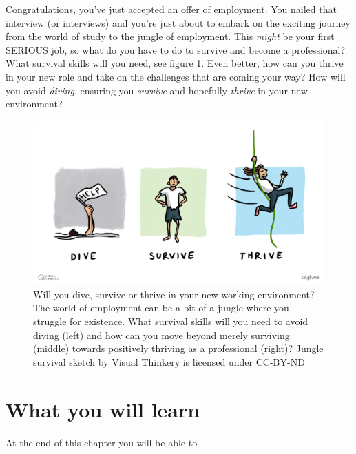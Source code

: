 \documentclass[
]{book}
\begin{document}
Congratulations, you've just accepted an offer of employment. You nailed that interview (or interviews) and you're just about to embark on the exciting journey from the world of study to the jungle of employment. This \emph{might} be your first SERIOUS job, so what do you have to do to survive and become a professional? What survival skills will you need, see figure \ref{fig:survival-fig}. Even better, how can you thrive in your new role and take on the challenges that are coming your way? How will you avoid \emph{diving}, ensuring you \emph{survive} and hopefully \emph{thrive} in your new environment? 💪

\begin{figure}

{\centering \includegraphics[width=1\linewidth]{images/Dive Thrive Survive} 

}

\caption{Will you dive, survive or thrive in your new working environment? The world of employment can be a bit of a jungle where you struggle for existence. What survival skills will you need to avoid diving (left) and how can you move beyond merely surviving (middle) towards positively thriving as a professional (right)? Jungle survival sketch by \href{https://visualthinkery.com}{Visual Thinkery} is licensed under \href{https://creativecommons.org/licenses/by-nd/4.0/}{CC-BY-ND}}\label{fig:survival-fig}
\end{figure}



\hypertarget{ilo10}{%
\section{What you will learn}\label{ilo10}}

At the end of this chapter you will be able to
\end{document}

